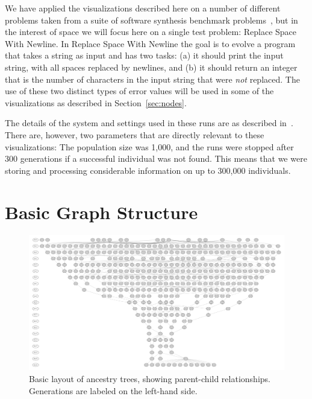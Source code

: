\documentclass{sig-alternate}
\begin{document}
We have applied the visualizations described here on a 
number of different problems taken from a suite of software synthesis benchmark 
problems~\cite{Helmuth:2015:GECCO}, but in the interest of space we
will focus here on a single test problem: Replace Space With Newline.
In Replace Space With Newline the goal is to evolve a program that takes a string
as input and has two tasks: (a) it should print the input string, with all spaces
replaced by newlines, and (b) it should return an integer that is the number of
characters in the input string that were \emph{not} replaced. The use of
these two distinct types of error values will be used in some of the visualizations
as described in Section~\ref{sec:nodes}. 

The details of the system and settings used in these runs are as described 
in~\cite{Helmuth:2015:GECCO}. There are, however, two parameters that are 
directly relevant to these visualizations: The population size was 1,000, and the runs were stopped after 300 generations if a successful individual was not 
found. This means that we were storing and processing considerable information
on up to 300,000 individuals.

\section{Basic Graph Structure}
\label{sec:basics}

\begin{figure}[b]
	\begin{center}
		\includegraphics[width=\linewidth]{../Figures/run0_basic_structure.pdf}
	\end{center}
	\caption{Basic layout of ancestry trees, showing parent-child relationships. Generations are labeled on the left-hand side.}
	\label{fig:lexRun0Basic}
\end{figure}
\end{document}
